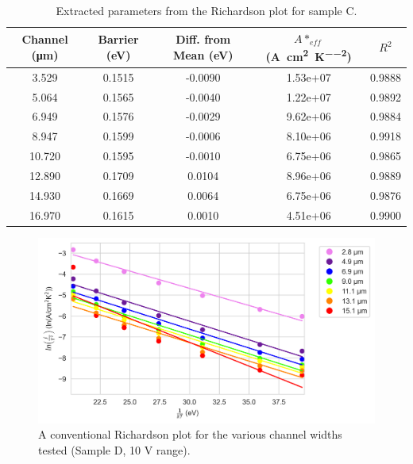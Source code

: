 \begin{table}[h]
    \centering
    \begin{tabular}{|c|c|c|c|c|}
        \hline
        Channel (\si{\micro\metre}) & Barrier (\si{\electronvolt}) & Diff. from Mean (\si{\electronvolt}) & $A*_{eff}$ (\si{\ampere\per\centi\metre\squared\per\kelvin\squared}) & $R^{2}$\\ \hline
        3.529 & 0.1515 & -0.0090 & 1.53e+07 &0.9888 \\ 
        5.064 & 0.1565 & -0.0040 & 1.22e+07 &0.9892 \\ 
        6.949 & 0.1576 & -0.0029 & 9.62e+06 &0.9884 \\ 
        8.947 & 0.1599 & -0.0006 & 8.10e+06 &0.9918 \\ 
        10.720 & 0.1595 & -0.0010 & 6.75e+06 &0.9865 \\ 
        12.890 & 0.1709 & 0.0104 & 8.96e+06 &0.9889 \\ 
        14.930 & 0.1669 & 0.0064 & 6.75e+06 &0.9876 \\ 
        16.970 & 0.1615 & 0.0010 & 4.51e+06 &0.9900 \\ 
        \hline
    \end{tabular}
    \caption{Extracted parameters from the Richardson plot for sample C.}
    \label{tab:richardsonC}
\end{table}
\begin{figure}
    \centering
    \includegraphics{Chapter6/Figs/Raster/Sample D 2019/10V_Richardson_Plot.png}
    \caption{A conventional Richardson plot for the various channel widths tested (Sample D, 10 V range).}
    \label{fig:enter-label}
\end{figure}

